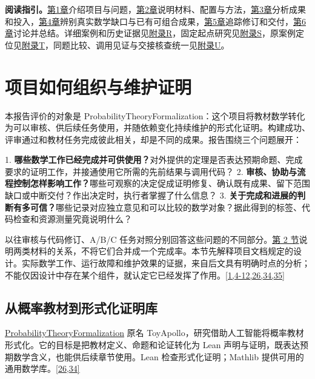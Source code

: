 \textbf{阅读指引。}\hyperlink{section-1}{第1章}介绍项目与问题，\hyperlink{section-2}{第2章}说明材料、配置与方法，\hyperlink{section-3}{第3章}分析成果和投入，\hyperlink{section-4}{第4章}辨别真实数学缺口与已有可组合成果，\hyperlink{section-5}{第5章}追踪修订和交付，\hyperlink{section-6}{第6章}讨论并总结。详细案例和历史证据见\href{zh-appendix.pdf\#appendix-r}{附录R}，固定起点研究见\href{zh-appendix.pdf\#appendix-s}{附录S}，原案例定位见\href{zh-appendix.pdf\#appendix-t}{附录T}，同题比较、调用见证与交接核查统一见\href{zh-appendix.pdf\#appendix-u}{附录U}。

\section[项目如何组织与维护证明]{\texorpdfstring{\protect\hypertarget{section-1}{}项目如何组织与维护证明}{项目如何组织与维护证明}}
\hypertarget{evaluation-questions}{}

本报告评价的对象是 ProbabilityTheoryFormalization：这个项目将教材数学转化为可以审核、供后续任务使用，并随依赖变化持续维护的形式化证明。构建成功、评审通过和教材任务完成彼此相关，却是不同的成果。报告围绕三个问题展开：

1. \textbf{哪些数学工作已经完成并可供使用？}对外提供的定理是否表达预期命题、完成要求的证明工作，并接通使用它所需的先前结果与调用代码？ 2. \textbf{审核、协助与流程控制怎样影响工作？}哪些可观察的决定促成证明修复、确认既有成果、留下范围缺口或中断交付？作出决定时，执行者掌握了什么信息？ 3. \textbf{关于完成和进展的判断有多可信？}哪些记录对应独立意见和可以比较的数学对象？据此得到的标签、代码检查和资源测量究竟说明什么？

以往审核与代码修订、A/B/C 任务对照分别回答这些问题的不同部分。\hyperlink{section-2}{第 2 节}说明两类材料的关系，不将它们合并成一个完成率。本节先解释项目文档规定的设计。实际数学工作、运行故障和维护效果的证据，来自后文具有明确时点的分析；不能仅因设计中存在某个组件，就认定它已经发挥了作用。\hyperlink{ref-1}{\mbox{[1,4-12,26,34,35]}}

\subsection[从概率教材到形式化证明库]{\texorpdfstring{\protect\hypertarget{section-1-1}{}从概率教材到形式化证明库}{从概率教材到形式化证明库}}
\href{https://github.com/Kind-NK-Hill/ProbabilityTheoryFormalization}{ProbabilityTheoryFormalization} 原名 ToyApollo，研究借助人工智能将概率教材形式化。它的目标是把教材定义、命题和论证转化为 Lean 声明与证明，既表达预期数学含义，也能供后续章节使用。Lean 检查形式化证明；Mathlib 提供可用的通用数学库。\hyperlink{ref-26}{\mbox{[26,34]}}


